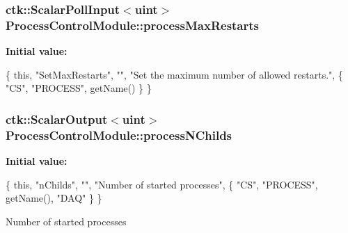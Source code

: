 \subsubsection[{\texorpdfstring{process\+Max\+Restarts}{processMaxRestarts}}]{\setlength{\rightskip}{0pt plus 5cm}ctk\+::\+Scalar\+Poll\+Input$<$uint$>$ Process\+Control\+Module\+::process\+Max\+Restarts}\hypertarget{structProcessControlModule_adc91d2e850a68ec74402d962e4305c4b}{}\label{structProcessControlModule_adc91d2e850a68ec74402d962e4305c4b}
{\bfseries Initial value\+:}
\begin{DoxyCode}
\{ \textcolor{keyword}{this}, \textcolor{stringliteral}{"SetMaxRestarts"}, \textcolor{stringliteral}{""},
    \textcolor{stringliteral}{"Set the maximum number of allowed restarts."},
    \{ \textcolor{stringliteral}{"CS"}, \textcolor{stringliteral}{"PROCESS"}, getName() \} \}
\end{DoxyCode}
\subsubsection[{\texorpdfstring{process\+N\+Childs}{processNChilds}}]{\setlength{\rightskip}{0pt plus 5cm}ctk\+::\+Scalar\+Output$<$uint$>$ Process\+Control\+Module\+::process\+N\+Childs}\hypertarget{structProcessControlModule_ad5ec578c8e25d6117e9c45de024319bc}{}\label{structProcessControlModule_ad5ec578c8e25d6117e9c45de024319bc}
{\bfseries Initial value\+:}
\begin{DoxyCode}
\{ \textcolor{keyword}{this}, \textcolor{stringliteral}{"nChilds"}, \textcolor{stringliteral}{""}, \textcolor{stringliteral}{"Number of started processes"},
    \{ \textcolor{stringliteral}{"CS"}, \textcolor{stringliteral}{"PROCESS"}, getName(), \textcolor{stringliteral}{"DAQ"} \} \}
\end{DoxyCode}
Number of started processes 
